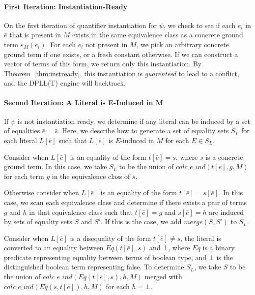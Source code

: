 \documentclass{llncs}
\begin{document}
\paragraph{First Iteration: Instantiation-Ready}

On the first iteration of quantifier instantiation for $\psi$, we check to see if each $e_i$ in $\bar{e}$ that is present in $M$ exists in the same equivalence class as a concrete ground term $\varepsilon_M(e_i)$.
For each $e_i$ not present in $M$, we pick an arbitrary concrete ground term if one exists, or a fresh constant otherwise.
If we can construct a vector of terms of this form, we return only this instantiation.
By Theorem~\ref{thm:instready}, this instantiation is \emph{guarenteed} to lead to a conflict, and the DPLL(T) engine will backtrack.

\paragraph{Second Iteration: A Literal is E-Induced in M}

If $\psi$ is not instantiation ready, we determine if any literal can be induced by a set of equalities $\bar{e} = \bar{s}$.
Here, we describe how to generate a set of equality sets $S_L$ for each literal $L[\bar{e}]$ such that $L[\bar{e}]$ is $E$-induced in $M$ for each $E \in S_L$.

Consider when $L[\bar{e}]$ is an equality of the form $t[\bar{e}] = s$, where $s$ is a concrete ground term.
In this case, we take $S_L$ to be the union of $calc\_e\_ind( t[\bar{e}], g, M )$ for each term $g$ in the equivalence class of $s$.

Otherwise consider when $L[\bar{e}]$ is an equality of the form $t[\bar{e}] = s[\bar{e}]$.
In this case, we scan each equivalence class and determine if there exists a pair of terms $g$ and $h$ in that equivalence class such that $t[\bar{e}] = g$ and $s[\bar{e}] = h$ are induced by sets of equality sets $S$ and $S'$.
If this is the case, we add $merge( S, S')$ to $S_L$.

Consider when $L[\bar{e}]$ is a disequality of the form $t[\bar{e}] \neq s$, the literal is converted to an equality between $Eq( t[\bar{e}], s )$ and $\bot$, where $Eq$ is a binary predicate representing equality between terms of boolean type, and $\bot$ is the distinguished boolean term representing false.
To determine $S_L$, we take $S$ to be the union of $calc\_e\_ind( Eq( t[\bar{e}], s ), h, M )$ merged with $calc\_e\_ind( Eq( s, t[\bar{e}] ), h, M )$ for each $h = \bot$.
\end{document}
